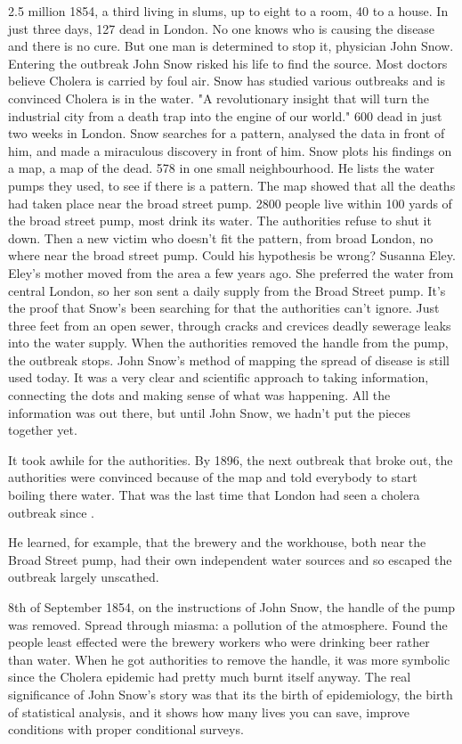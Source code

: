 \documentclass[12pt]{article}
\begin{document}
2.5 million 1854, a third living in slums, up to eight to a room, 40 to a house. 
 In just three days, 127 dead in London. No one knows who is causing the disease and there is no cure. But one man is determined to stop it, physician John Snow. Entering the outbreak John Snow risked his life to find the source. Most doctors believe Cholera is carried by foul air. Snow has studied various outbreaks and is convinced Cholera is in the water. "A revolutionary insight that will turn the industrial city from a death trap into the engine of our world." 600 dead in just two weeks in London. Snow searches for a pattern, analysed the data in front of him, and made a miraculous discovery in front of him. Snow plots his findings on a map, a map of the dead. 578 in one small neighbourhood. He lists the water pumps they used, to see if there is a pattern. The map showed that all the deaths had taken place near the broad street pump. 2800 people live within 100 yards of the broad street pump, most drink its water. The authorities refuse to shut it down. Then a new victim who doesn't fit the pattern, from broad London, no where near the broad street pump. Could his hypothesis be wrong? Susanna Eley. Eley's mother moved from the area a few years ago. She preferred the water from central London, so her son sent a daily supply from the Broad Street pump. It's the proof that Snow's been searching for that the authorities can't ignore. Just three feet from an open sewer, through cracks and crevices deadly sewerage leaks into the water supply. When the authorities removed the handle from the pump, the outbreak stops. John Snow's method of mapping the spread of disease is still used today. It was a very clear and scientific approach to taking information, connecting the dots and making sense of what was happening. All the information was out there, but until John Snow, we hadn't put the pieces together yet. \cite{channel1}

It took awhile for the authorities. By 1896, the next outbreak that broke out, the authorities were convinced because of the map and told everybody to start boiling there water. That was the last time that London had seen a cholera outbreak since \cite{tedtalk}. 

He learned, for example, that the brewery and the workhouse, both near the Broad Street pump, had their own independent water sources and so escaped the outbreak largely unscathed. \cite{blog}

8th of September 1854, on the instructions of John Snow, the handle of the pump was removed. Spread through miasma: a pollution of the atmosphere. Found the people least effected were the brewery workers who were drinking beer rather than water. When he got authorities to remove the handle, it was more symbolic since the Cholera epidemic had pretty much burnt itself anyway. The real significance of John Snow's story was that its the birth of epidemiology, the birth of statistical analysis, and it shows how many lives you can save, improve conditions with proper conditional surveys. \cite{youtube}
\end{document}
